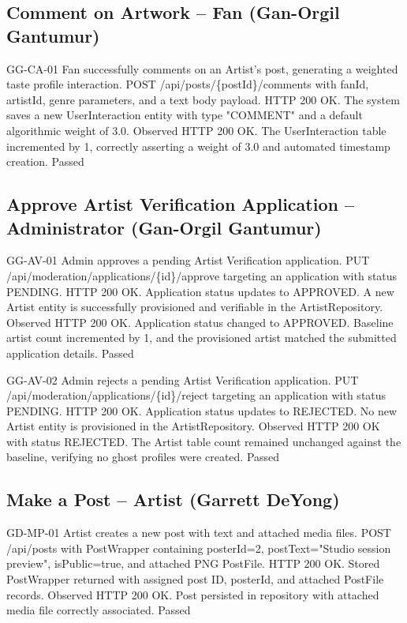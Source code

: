\documentclass[11pt]{report}
\begin{document}
\subsection*{Comment on Artwork -- Fan (Gan-Orgil Gantumur)}
\gantestcase
{GG-CA-01}
{Fan successfully comments on an Artist's post, generating a weighted taste profile interaction.}
{POST /api/posts/\{postId\}/comments with fanId, artistId, genre parameters, and a text body payload.}
{HTTP 200 OK. The system saves a new UserInteraction entity with type "COMMENT" and a default algorithmic weight of 3.0.}
{Observed HTTP 200 OK. The UserInteraction table incremented by 1, correctly asserting a weight of 3.0 and automated timestamp creation.}
{Passed}

\clearpage
\subsection*{Approve Artist Verification Application -- Administrator (Gan-Orgil Gantumur)}
\gantestcase
{GG-AV-01}
{Admin approves a pending Artist Verification application.}
{PUT /api/moderation/applications/\{id\}/approve targeting an application with status PENDING.}
{HTTP 200 OK. Application status updates to APPROVED. A new Artist entity is successfully provisioned and verifiable in the ArtistRepository.}
{Observed HTTP 200 OK. Application status changed to APPROVED. Baseline artist count incremented by 1, and the provisioned artist matched the submitted application details.}
{Passed}

\gantestcase
{GG-AV-02}
{Admin rejects a pending Artist Verification application.}
{PUT /api/moderation/applications/\{id\}/reject targeting an application with status PENDING.}
{HTTP 200 OK. Application status updates to REJECTED. No new Artist entity is provisioned in the ArtistRepository.}
{Observed HTTP 200 OK with status REJECTED. The Artist table count remained unchanged against the baseline, verifying no ghost profiles were created.}
{Passed}

\clearpage
\subsection*{Make a Post -- Artist (Garrett DeYong)}
\garretttestcase
{GD-MP-01}
{Artist creates a new post with text and attached media files.}
{POST /api/posts with PostWrapper containing posterId=2, postText="Studio session preview", isPublic=true, and attached PNG PostFile.}
{HTTP 200 OK. Stored PostWrapper returned with assigned post ID, posterId, and attached PostFile records.}
{Observed HTTP 200 OK. Post persisted in repository with attached media file correctly associated.}
{Passed}
\end{document}
